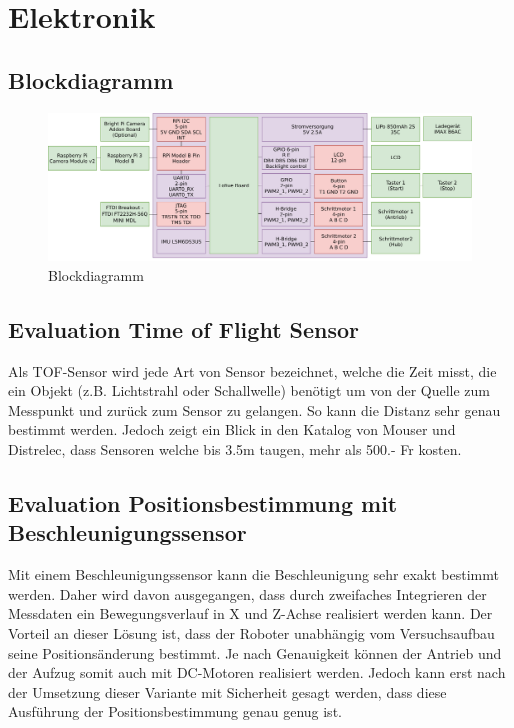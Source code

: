 \documentclass[a4paper]{report}
\begin{document}
\section{Elektronik}
\label{app:sec:ET}
\subsection{Blockdiagramm}
\label{app:ssec:BlockDiag}

\begin{figure}[h!]
  \includegraphics[keepaspectratio,width=\textwidth]{BlockdiagrammElektronik}
  \caption{Blockdiagramm}
  \label{fig:ElektronikBlockdiagramm}
\end{figure}

\newpage
\subsection{Evaluation Time of Flight Sensor}
\label{app:ssec:EvalTOF}
Als TOF-Sensor wird jede Art von Sensor bezeichnet, welche die Zeit misst, die ein Objekt (z.B. Lichtstrahl oder Schallwelle) benötigt um von der Quelle zum Messpunkt und zurück zum Sensor zu gelangen. So kann die Distanz sehr genau bestimmt werden. Jedoch zeigt ein Blick in den Katalog von Mouser und Distrelec, dass Sensoren welche bis 3.5m taugen, mehr als 500.- Fr kosten.

\subsection{Evaluation Positionsbestimmung mit Beschleunigungssensor}
\label{app:ssec:EvalPosBestBeschleunigung}
Mit einem Beschleunigungssensor kann die Beschleunigung sehr exakt bestimmt werden. Daher wird davon ausgegangen, dass durch zweifaches Integrieren der Messdaten ein Bewegungsverlauf in X und Z-Achse realisiert werden kann. Der Vorteil an dieser Lösung ist, dass der Roboter unabhängig vom Versuchsaufbau seine Positionsänderung bestimmt. Je nach Genauigkeit können der Antrieb und der Aufzug somit auch mit DC-Motoren realisiert werden. Jedoch kann erst nach der Umsetzung dieser Variante mit Sicherheit gesagt werden, dass diese Ausführung der Positionsbestimmung genau genug ist.
\end{document}
